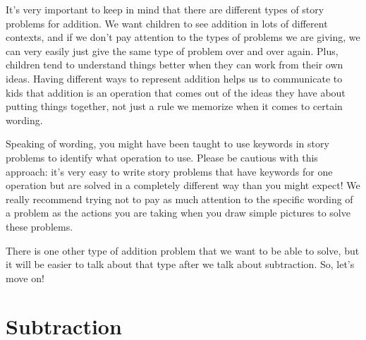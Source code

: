\documentclass{ximera}
\begin{document}
It's very important to keep in mind that there are different types of story problems for addition. We want children to see addition in lots of different contexts, and if we don't pay attention to the types of problems we are giving, we can very easily just give the same type of problem over and over again. Plus, children tend to understand things better when they can work from their own ideas. Having different ways to represent addition helps us to communicate to kids that addition is an operation that comes out of the ideas they have about putting things together, not just a rule we memorize when it comes to certain wording.

Speaking of wording, you might have been taught to use keywords in story problems to identify what operation to use. Please be cautious with this approach: it's very easy to write story problems that have keywords for one operation but are solved in a completely different way than you might expect! We really recommend trying not to pay as much attention to the specific wording of a problem as the actions you are taking when you draw simple pictures to solve these problems.

There is one other type of addition problem that we want to be able to solve, but it will be easier to talk about that type after we talk about subtraction. So, let's move on!


\section{Subtraction}
\end{document}
